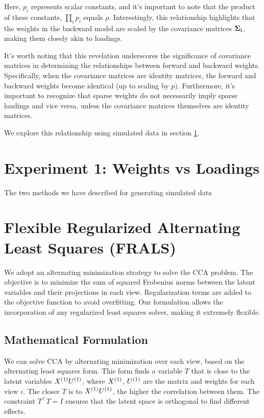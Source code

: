 Here, $p_i$ represents scalar constants, and it's important to note that the product of these constants, $\prod_i p_i$ equals $\rho$.
Interestingly, this relationship highlights that the weights in the backward model are scaled by the covariance matrices $\bold{\Sigma_i}$, making them closely akin to loadings.

It's worth noting that this revelation underscores the significance of covariance matrices in determining the relationships between forward and backward weights.
Specifically, when the covariance matrices are identity matrices, the forward and backward weights become identical (up to scaling by $p$).
Furthermore, it's important to recognize that sparse weights do not necessarily imply sparse loadings and vice versa, unless the covariance matrices themselves are identity matrices.

We explore this relationship using simulated data in section \ref{sec:exp1}.

\section{Experiment 1: Weights vs Loadings}\label{sec:exp1}

The two methods we have described for generating simulated data

\section{Flexible Regularized Alternating Least Squares (FRALS)}\label{subsec:flexible-regularized-alternating-least-squares-(frals)}
We adopt an alternating minimization strategy to solve the CCA problem.
The objective is to minimize the sum of squared Frobenius norms between the latent variables and their projections in each view.
Regularization terms are added to the objective function to avoid overfitting.
Our formulation allows the incorporation of any regularized least squares solver, making it extremely flexible.

\subsection{Mathematical Formulation}
We can solve CCA by alternating minimization over each view, based on the alternating least squares form.
This form finds a variable \( T \) that is close to the latent variables \( X^{(1)} U^{(1)} \), where \( X^{(1)} \), \( U^{(1)} \) are the matrix and weights for each view \( i \).
The closer \( T \) is to \( X^{(1)} U^{(1)} \), the higher the correlation between them.
The constraint \( T^\top T = I \) ensures that the latent space is orthogonal to find different effects.

